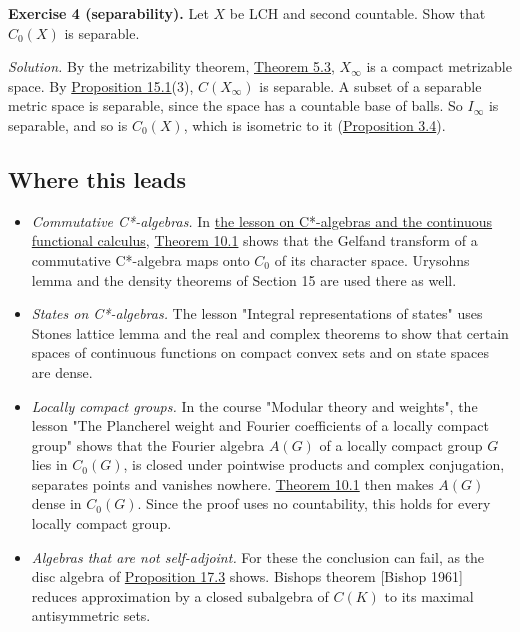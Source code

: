\documentclass[
  english,
  11pt,
  a4paper,
]{article}
\providecommand{\tightlist}{%
  \setlength{\itemsep}{0pt}\setlength{\parskip}{0pt}}
\begin{document}
\textbf{Exercise 4 (separability).} Let \(X\) be LCH and second
countable. Show that \(C_0(X)\) is separable.

\emph{Solution.} By the metrizability theorem,
\hyperlink{the-stone-weierstrass-theorem-for-functions-vanishing-at-infinity--oa-fnd-sw-16}{Theorem
5.3}, \(X_\infty\) is a compact metrizable space. By
\hyperlink{the-stone-weierstrass-theorem-for-functions-vanishing-at-infinity--oa-fnd-sw-17}{Proposition
15.1}(3), \(C(X_\infty)\) is separable. A subset of a separable metric
space is separable, since the space has a countable base of balls. So
\(I_\infty\) is separable, and so is \(C_0(X)\), which is isometric to
it
(\hyperlink{the-stone-weierstrass-theorem-for-functions-vanishing-at-infinity--oa-fnd-sw-03}{Proposition
3.4}).

\subsection{Where this
leads}\label{the-stone-weierstrass-theorem-for-functions-vanishing-at-infinity--where-this-leads}

\begin{itemize}
\tightlist
\item
  \emph{Commutative C*-algebras.} In
  \href{https://kokunoyumeto.github.io/open-math-courses/courses/harmonic-analysis-on-locally-compact-groups/reader/programme-reading.html\#ref-a8616a90904d331b}{the
  lesson on C*-algebras and the continuous functional calculus},
  \hyperlink{the-stone-weierstrass-theorem-for-functions-vanishing-at-infinity--oa-fnd-sw-09}{Theorem
  10.1} shows that the Gelfand transform of a commutative C*-algebra
  maps onto \(C_0\) of its character space. Urysohn\textquotesingle s
  lemma and the density theorems of Section 15 are used there as well.
\item
  \emph{States on C*-algebras.} The lesson "Integral representations of
  states" uses Stone\textquotesingle s lattice lemma and the real and
  complex theorems to show that certain spaces of continuous functions
  on compact convex sets and on state spaces are dense.
\item
  \emph{Locally compact groups.} In the course "Modular theory and
  weights", the lesson "The Plancherel weight and Fourier coefficients
  of a locally compact group" shows that the Fourier algebra \(A(G)\) of
  a locally compact group \(G\) lies in \(C_0(G)\), is closed under
  pointwise products and complex conjugation, separates points and
  vanishes nowhere.
  \hyperlink{the-stone-weierstrass-theorem-for-functions-vanishing-at-infinity--oa-fnd-sw-09}{Theorem
  10.1} then makes \(A(G)\) dense in \(C_0(G)\). Since the proof uses no
  countability, this holds for every locally compact group.
\item
  \emph{Algebras that are not self-adjoint.} For these the conclusion
  can fail, as the disc algebra of
  \hyperlink{the-stone-weierstrass-theorem-for-functions-vanishing-at-infinity--oa-fnd-sw-19}{Proposition
  17.3} shows. Bishop\textquotesingle s theorem {[}Bishop 1961{]}
  reduces approximation by a closed subalgebra of \(C(K)\) to its
  maximal antisymmetric sets.
\end{itemize}
\end{document}
